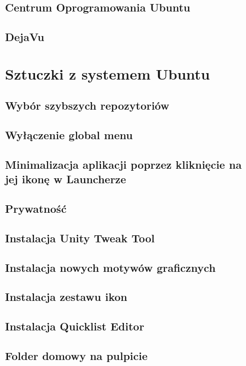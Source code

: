\documentclass[a4paper,11pt,oneside]{mwart}
\begin{document}
		\subsection{Centrum Oprogramowania Ubuntu}
			
		\subsection{DejaVu}
	\section{Sztuczki z systemem Ubuntu}
		
		\subsection{Wybór szybszych repozytoriów}
			
		\subsection{Wyłączenie global menu}
			
		\subsection{Minimalizacja aplikacji poprzez kliknięcie na jej ikonę w Launcherze}
			
		\subsection{Prywatność}
			
		\subsection{Instalacja Unity Tweak Tool}
			
		\subsection{Instalacja nowych motywów graficznych}
			
		\subsection{Instalacja zestawu ikon}
			
		\subsection{Instalacja Quicklist Editor}
			
		\subsection{Folder domowy na pulpicie}
			
\end{document}
